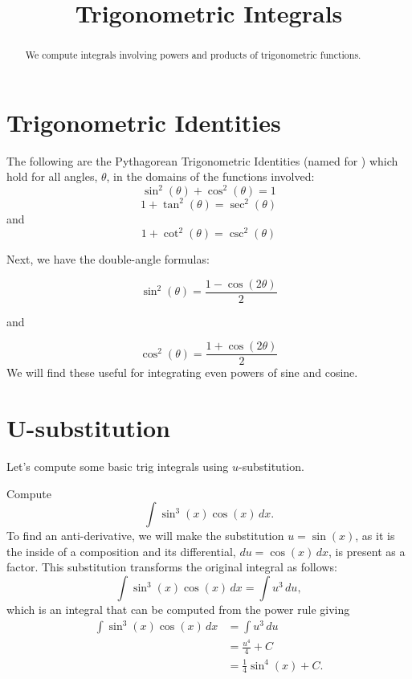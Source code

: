 \documentclass{ximera}
\title{Trigonometric Integrals}
\begin{document}
\begin{abstract}
We compute integrals involving powers and products of trigonometric functions.
\end{abstract}

\maketitle

\section{Trigonometric Identities}

The following are the Pythagorean Trigonometric Identities (named for ) which hold for all angles,
$\theta$, in the domains of the functions involved:
\[
\sin^2(\theta) + \cos^2(\theta) = 1
\]
\[
1 + \tan^2(\theta) = \sec^2(\theta)
\]
and
\[
1 + \cot^2(\theta) = \csc^2(\theta)
\]

Next, we have the double-angle formulas:

\[
\sin^2(\theta) = \frac{1-\cos(2\theta)}{2}
\]

and

\[
\cos^2(\theta) = \frac{1+\cos(2\theta)}{2}
\]
We will find these useful for integrating even powers of sine and cosine.

\section{U-substitution}
Let's compute some basic trig integrals using $u$-substitution.

\begin{example}
Compute
\[
\int \sin^3(x) \cos(x) \, dx.
\]
To find an anti-derivative, we will make the substitution $u = \sin(x)$, as it is the inside of a composition
and its differential, $du = \cos(x) \, dx$, is present as a factor. 
This substitution transforms the original integral as follows:
\[
\int \sin^3(x) \cos(x) \, dx = \int u^3 \, du,
\]
which is an integral that can be computed from the power rule giving
\begin{align*}
\int \sin^3(x) \cos(x) \, dx &= \int u^3 \, du\\
                             &= \frac{u^4}{4} + C\\
                             &= \frac14 \sin^4(x) + C.
\end{align*}

\end{example}
\end{document}
